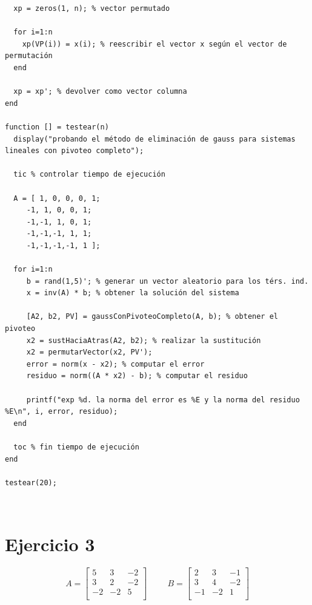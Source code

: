 \documentclass{article}
\begin{document}
\begin{lstlisting}
  xp = zeros(1, n); % vector permutado

  for i=1:n
    xp(VP(i)) = x(i); % reescribir el vector x según el vector de permutación
  end

  xp = xp'; % devolver como vector columna
end

function [] = testear(n)
  display("probando el método de eliminación de gauss para sistemas lineales con pivoteo completo");

  tic % controlar tiempo de ejecución

  A = [ 1, 0, 0, 0, 1;
     -1, 1, 0, 0, 1;
     -1,-1, 1, 0, 1;
     -1,-1,-1, 1, 1;
     -1,-1,-1,-1, 1 ];

  for i=1:n
     b = rand(1,5)'; % generar un vector aleatorio para los térs. ind.
     x = inv(A) * b; % obtener la solución del sistema

     [A2, b2, PV] = gaussConPivoteoCompleto(A, b); % obtener el pivoteo
     x2 = sustHaciaAtras(A2, b2); % realizar la sustitución
     x2 = permutarVector(x2, PV');
     error = norm(x - x2); % computar el error
     residuo = norm((A * x2) - b); % computar el residuo

     printf("exp %d. la norma del error es %E y la norma del residuo %E\n", i, error, residuo);
  end

  toc % fin tiempo de ejecución
end

testear(20);
\end{lstlisting}
\\


\section{Ejercicio 3}
\[
A=\begin{bmatrix}
5 & 3 & -2 \\
3 & 2 & -2 \\
-2 & -2 & 5 \\
\end{bmatrix} 
\hspace{1cm}
B=\begin{bmatrix}
2 & 3 & -1 \\
3 & 4 & -2 \\
-1 & -2 & 1 \\
\end{bmatrix}
\]\\
\end{document}
